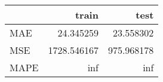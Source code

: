 \begin{tabular}{lrr}
\toprule
{} &        train &        test \\
\midrule
MAE  &    24.345259 &   23.558302 \\
MSE  &  1728.546167 &  975.968178 \\
MAPE &          inf &         inf \\
\bottomrule
\end{tabular}
